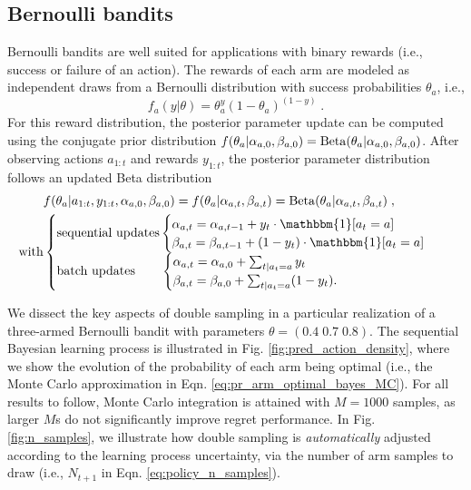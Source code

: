 \documentclass{article}
\newcommand{\ie}{i.e., }
\newcommand{\Beta}{{\rm Beta}}
\begin{document}
\subsection{Bernoulli bandits}
\label{ssec:bernoulli_bandits}

Bernoulli bandits are well suited for applications with binary rewards (\ie success or failure of an action). The rewards of each arm are modeled as independent draws from a Bernoulli distribution with success probabilities $\theta_a$, \ie
\begin{equation}
f_a(y|\theta)=\theta_a^{y}(1-\theta_a)^{(1-y)} \; .
\end{equation}
For this reward distribution, the posterior parameter update can be computed using the conjugate prior distribution $f(\theta_a|\alpha_{a,0}, \beta_{a,0})=\Beta(\theta_a|\alpha_{a,0}, \beta_{a,0})$. After observing actions $a_{1:t}$ and rewards $y_{1:t}$, the posterior parameter distribution follows an updated Beta distribution
\begin{equation}\begin{split}
&f(\theta_a|a_{1:t}, y_{1:t}, \alpha_{a,0}, \beta_{a,0}) =f(\theta_a|\alpha_{a,t}, \beta_{a,t})=\Beta(\theta_a|\alpha_{a,t}, \beta_{a,t})  \; ,\\
\text{with} & \begin{cases}
\text{sequential updates} \begin{cases}
\alpha_{a,t}=\alpha_{a,t-1} + y_{t} \cdot \mathbbm{1}[a_t=a]\\
\beta_{a,t}=\beta_{a,t-1} + (1 - y_{t}) \cdot \mathbbm{1}[a_t=a]
\end{cases} \\
\text{batch updates} \qquad \begin{cases}
\alpha_{a,t}=\alpha_{a,0} + \sum_{t|a_t=a} y_{t} \\
\beta_{a,t}=\beta_{a,0} + \sum_{t|a_t=a} (1-y_{t}).
\end{cases}
\end{cases}
\end{split}
\end{equation}

We dissect the key aspects of double sampling in a particular realization of a three-armed Bernoulli bandit with parameters $\theta=\left(0.4 \; 0.7 \; 0.8 \right)$. The sequential Bayesian learning process is illustrated in Fig. \ref{fig:pred_action_density}, where we show the evolution of the probability of each arm being optimal (\ie the Monte Carlo approximation in Eqn. \ref{eq:pr_arm_optimal_bayes_MC}). For all results to follow, Monte Carlo integration is attained with $M=1000$ samples, as larger $M$s do not significantly improve regret performance. In Fig. \ref{fig:n_samples}, we illustrate how double sampling is {\em automatically} adjusted according to the learning process uncertainty, via the number of arm samples to draw (\ie $N_{t+1}$ in Eqn. \ref{eq:policy_n_samples}).
\end{document}
